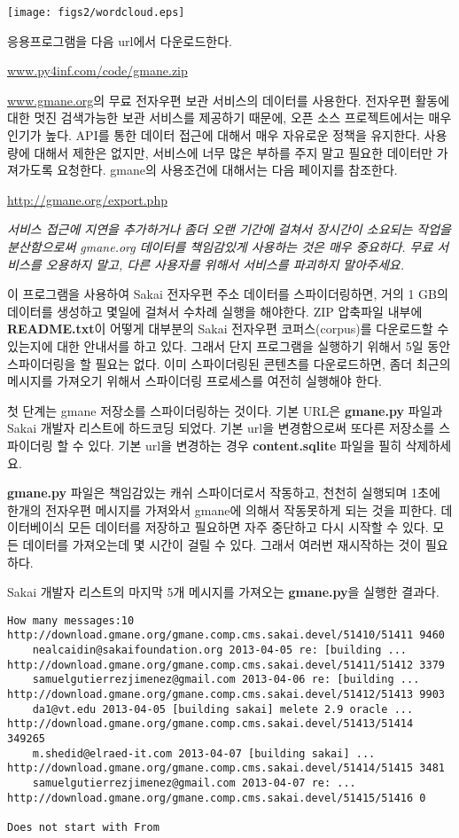 \beforefig
\centerline{\texttt{[image: figs2/wordcloud.eps]}}
\afterfig

응용프로그램을 다음 url에서 다운로드한다.

\url{www.py4inf.com/code/gmane.zip}

\url{www.gmane.org}의 무료 전자우편 보관 서비스의 데이터를 사용한다.
전자우편 활동에 대한 멋진 검색가능한 보관 서비스를 제공하기 때문에,
오픈 소스 프로젝트에서는 매우 인기가 높다.
API를 통한 데이터 접근에 대해서 매우 자유로운 정책을 유지한다.
사용량에 대해서 제한은 없지만, 서비스에 너무 많은 부하를 주지 말고 필요한 데이터만 가져가도록 요청한다.
gmane의 사용조건에 대해서는 다음 페이지를 참조한다.

\url{http://gmane.org/export.php}

{\em 서비스 접근에 지연을 추가하거나 좀더 오랜 기간에 걸쳐서 장시간이 소요되는 작업을 분산함으로써
gmane.org 데이터를 책임감있게 사용하는 것은 매우 중요하다. 무료 서비스를 오용하지 말고, 다른 사용자를 위해서 
서비스를 파괴하지 말아주세요.}

이 프로그램을 사용하여 Sakai 전자우편 주소 데이터를 스파이더링하면, 거의 1 GB의 데이터를 생성하고
몇일에 걸쳐서 수차례 실행을 해야한다. 
ZIP 압축파일 내부에 {\bf README.txt}이 어떻게 대부분의 Sakai 전자우편 코퍼스(corpus)를
다운로드할 수 있는지에 대한 안내서를 하고 있다. 그래서 단지 프로그램을 실행하기 위해서 5일 동안 
스파이더링을 할 필요는 없다. 이미 스파이더링된 콘텐츠를 다운로드하면, 좀더 최근의 메시지를 가져오기 위해서
스파이더링 프로세스를 여전히 실행해야 한다.

첫 단계는 gmane 저장소를 스파이더링하는 것이다. 기본 URL은 {\bf gmane.py} 파일과
Sakai 개발자 리스트에 하드코딩 되었다. 기본 url을 변경함으로써 또다른 저장소를 스파이더링 할 수 있다.
기본 url을 변경하는 경우 {\bf content.sqlite} 파일을 필히 삭제하세요.

{\bf gmane.py} 파일은 책임감있는 캐쉬 스파이더로서 작동하고, 천천히 실행되며 1초에 한개의 전자우편
메시지를 가져와서 gmane에 의해서 작동못하게 되는 것을 피한다.
데이터베이싀 모든 데이터를 저장하고 필요하면 자주 중단하고 다시 시작할 수 있다.
모든 데이터를 가져오는데 몇 시간이 걸릴 수 있다. 그래서 여러번 재시작하는 것이 필요하다. 

Sakai 개발자 리스트의 마지막 5개 메시지를 가져오는 {\bf gmane.py}을 실행한 결과다.

\beforeverb
\begin{verbatim}
How many messages:10
http://download.gmane.org/gmane.comp.cms.sakai.devel/51410/51411 9460
    nealcaidin@sakaifoundation.org 2013-04-05 re: [building ...
http://download.gmane.org/gmane.comp.cms.sakai.devel/51411/51412 3379
    samuelgutierrezjimenez@gmail.com 2013-04-06 re: [building ...
http://download.gmane.org/gmane.comp.cms.sakai.devel/51412/51413 9903
    da1@vt.edu 2013-04-05 [building sakai] melete 2.9 oracle ...
http://download.gmane.org/gmane.comp.cms.sakai.devel/51413/51414 349265
    m.shedid@elraed-it.com 2013-04-07 [building sakai] ...
http://download.gmane.org/gmane.comp.cms.sakai.devel/51414/51415 3481
    samuelgutierrezjimenez@gmail.com 2013-04-07 re: ...
http://download.gmane.org/gmane.comp.cms.sakai.devel/51415/51416 0

Does not start with From 
\end{verbatim}
\afterverb
%

